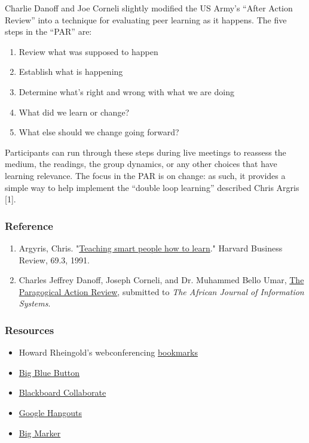 Charlie Danoff and Joe Corneli slightly modified the US Army's ``After
Action Review'' into a technique for evaluating peer learning as it
happens. The five steps in the ``PAR'' are:

\begin{enumerate}
\item
  Review what was supposed to happen
\item
  Establish what is happening
\item
  Determine what's right and wrong with what we are doing
\item
  What did we learn or change?
\item
  What else should we change going forward?
\end{enumerate}
Participants can run through these steps during live meetings to
reassess the medium, the readings, the group dynamics, or any other
choices that have learning relevance. The focus in the PAR is on change:
as such, it provides a simple way to help implement the ``double loop
learning'' described Chris Argris {[}1{]}.

\subsubsection{\textbf{Reference}}

\begin{enumerate}
\item
  Argyris, Chris.
  "\href{http://pds8.egloos.com/pds/200805/20/87/chris\_argyris\_learning.pdf}{Teaching
  smart people how to learn}." Harvard Business Review, 69.3, 1991.
\item
  Charles Jeffrey Danoff, Joseph Corneli, and Dr. Muhammed Bello Umar,
  \href{http://metameso.org/~joe/docs/The-Paragogical-Action-Review.pdf}{The
  Paragogical Action Review}, submitted to \emph{The African Journal of
  Information Systems}.
\end{enumerate}

\subsubsection{\textbf{Resources}}

\begin{itemize}
\item
  Howard Rheingold's webconferencing
  \href{http://delicious.com/hrheingold/webconferencing}{bookmarks}
\item
  \href{http://www.bigbluebutton.org/}{Big Blue Button}
\item
  \href{http://www.blackboard.com/platforms/collaborate/overview.aspx}{Blackboard
  Collaborate}
\item
  \href{http://www.google.com/+/learnmore/hangouts/}{Google Hangouts}
\item
  \href{http://www.bigmarker.com/about}{Big Marker}
\end{itemize}

